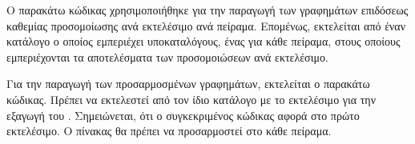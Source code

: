 Ο παρακάτω κώδικας χρησιμοποιήθηκε για την παραγωγή των γραφημάτων επιδόσεως καθεμίας προσομοίωσης ανά εκτελέσιμο ανά πείραμα. Επομένως, εκτελείται από έναν κατάλογο ο οποίος εμπεριέχει υποκαταλόγους, ένας για κάθε πείραμα, στους οποίους εμπεριέχονται τα αποτελέσματα των προσομοιώσεων ανά εκτελέσιμο. 

\clearpage
{}


Για την παραγωγή των προσαρμοσμένων γραφημάτων, εκτελείται ο παρακάτω κώδικας. Πρέπει να εκτελεστεί από τον ίδιο κατάλογο με το εκτελέσιμο  για την εξαγωγή του . Σημειώνεται, ότι ο συγκεκριμένος κώδικας αφορά στο πρώτο εκτελέσιμο. Ο πίνακας \texttt{} θα πρέπει να προσαρμοστεί στο κάθε πείραμα.

\clearpage
{}


